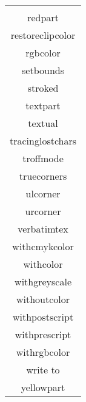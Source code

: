 \begin{table}
\begin{tabular}{|c|}
\begin{minipage}[b]{.75\linewidth}
\begin{multicols}{3}
readfrom\\
redpart\\
restoreclipcolor\\
rgbcolor\\
setbounds\\
stroked\\
textpart\\
textual\\
tracinglostchars\\
troffmode\\
truecorners\\
ulcorner\\
urcorner\\
verbatimtex\\
withcmykcolor\\
withcolor\\
withgreyscale\\
withoutcolor\\
withpostscript\\
withprescript\\
withrgbcolor\\
write to\\
yellowpart
\end{multicols}
\end{minipage}\\\hline


\end{tabular}
\end{table}
